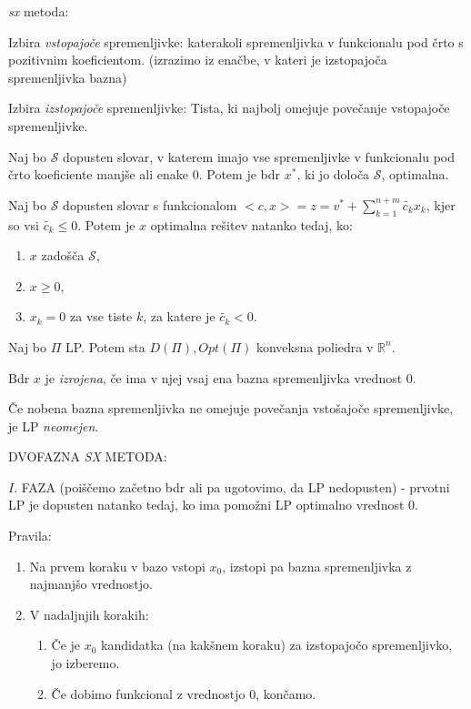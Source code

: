 \documentclass[10pt,a4paper]{amsart}
\theoremstyle{definition} %
\theoremstyle{plain} %
\newcommand{\R}{\mathbb R}
\begin{document}
 \emph{sx} metoda:

 Izbira \emph{vstopajoče} spremenljivke: katerakoli spremenljivka v funkcionalu pod črto s pozitivnim koeficientom. (izrazimo iz enačbe, v kateri je izstopajoča spremenljivka bazna)

 Izbira \emph{izstopajoče} spremenljivke: Tista, ki najbolj omejuje povečanje vstopajoče spremenljivke.

 Naj bo $\mathcal{S}$ dopusten slovar, v katerem imajo vse spremenljivke v funkcionalu pod črto koeficiente manjše ali enake $0$. Potem je bdr $x^*$, ki jo določa $\mathcal{S}$, optimalna.

 Naj bo $\mathcal{S}$ dopusten slovar s funkcionalom $<c,x> = z = v^* + \sum \limits_{k=1}^{n+m}\tilde{c_k} x_k$, kjer so vsi $\tilde{c_k} \leq 0$. Potem je $x$ optimalna rešitev natanko tedaj, ko:

 \begin{enumerate}
 \item $x$ zadošča $\mathcal{S}$,
 \item $x \geq 0$,
 \item $x_k = 0$ za vse tiste $k$, za katere je $\tilde{c_k} < 0.$
 \end{enumerate}

 Naj bo $\Pi$ LP. Potem sta $D(\Pi), Opt(\Pi)$ konveksna poliedra v $\R^n$.

 Bdr $x$ je \emph{izrojena}, če ima v njej vsaj ena bazna spremenljivka vrednost $0$.

 Če nobena bazna spremenljivka ne omejuje povečanja vstošajoče spremenljivke, je LP \emph{neomejen}.

 \thispagestyle{empty}

 DVOFAZNA \emph{SX} METODA:

 $I.$ FAZA (poiščemo začetno bdr ali pa ugotovimo, da LP nedopusten) - prvotni LP je dopusten natanko tedaj, ko ima pomožni LP optimalno vrednost 0.

 Pravila:
 \begin{enumerate}
 \item Na prvem koraku v bazo vstopi $x_0$, izstopi pa bazna spremenljivka z najmanjšo vrednostjo.

\item V nadaljnjih korakih:
\begin{enumerate}
\item Če je $x_0$ kandidatka (na kakšnem koraku) za izstopajočo spremenljivko, jo izberemo.
\item Če dobimo funkcional z vrednostjo $0$, končamo.
\end{enumerate}
\end{enumerate}
\end{document}
